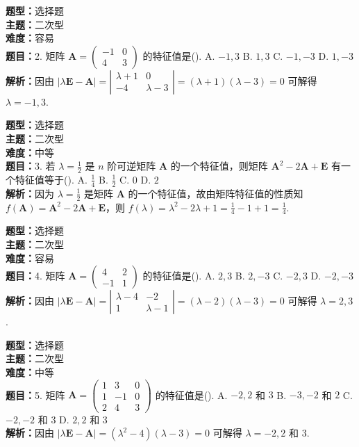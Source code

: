 \documentclass{ctexart}
\newenvironment{question}[5]{%
	\noindent\textbf{题型：}#1\\
	\textbf{主题：}#2\\
	\textbf{难度：}#3\\
	\textbf{题目：}#4\\
	\textbf{解析：}#5\\
	\vspace{1em}
}{}
\begin{document}
	
	\begin{question}
		{选择题}
		{二次型}
		{容易}
		{2. 矩阵 \(\mathbf{A}=\left(\begin{array}{cc}-1 & 0 \\ 4 & 3\end{array}\right)\) 的特征值是(\qquad). 
			A. \(-1,3\)
			B. \(1,3\)
			C. \(-1,-3\)
			D. \(1,-3\)}
		{因由 \(|\lambda \mathbf{E}-\mathbf{A}|=\left|\begin{array}{cc}\lambda+1 & 0 \\ -4 & \lambda-3\end{array}\right|=(\lambda+1)(\lambda-3)=0\) 可解得 \(\lambda=-1,3\). }
	\end{question}
	
	\begin{question}
		{选择题}
		{二次型}
		{中等}
		{3. 若 \(\lambda=\frac{1}{2}\) 是 \(n\) 阶可逆矩阵 \(\mathbf{A}\) 的一个特征值，则矩阵 \(\mathbf{A}^2-2 \mathbf{A}+\mathbf{E}\) 有一个特征值等于(\qquad). 
			A. \(\frac{1}{4}\)
			B. \(\frac{1}{2}\)
			C. \(0\)
			D. \(2\)}
		{因为 \(\lambda=\frac{1}{2}\) 是矩阵 \(\mathbf{A}\) 的一个特征值，故由矩阵特征值的性质知 \(f(\mathbf{A})=\mathbf{A}^2-2 \mathbf{A}+\mathbf{E}\)，则 \(f(\lambda)=\lambda^2-2 \lambda+1=\frac{1}{4}-1+1=\frac{1}{4}\). }
	\end{question}
	
	\begin{question}
		{选择题}
		{二次型}
		{容易}
		{4. 矩阵 \(\mathbf{A}=\left(\begin{array}{cc}4 & 2 \\ -1 & 1\end{array}\right)\) 的特征值是(\qquad). 
			A. \(2,3\)
			B. \(2,-3\)
			C. \(-2,3\)
			D. \(-2,-3\)}
		{因由 \(|\lambda \mathbf{E}-\mathbf{A}|=\left|\begin{array}{cc}\lambda-4 & -2 \\ 1 & \lambda-1\end{array}\right|=(\lambda-2)(\lambda-3)=0\) 可解得 \(\lambda=2,3\). }
	\end{question}
	
	\begin{question}
		{选择题}
		{二次型}
		{中等}
		{5. 矩阵 \(\mathbf{A}=\left(\begin{array}{ccc}1 & 3 & 0 \\ 1 & -1 & 0 \\ 2 & 4 & 3\end{array}\right)\) 的特征值是(\qquad). 
			A. \(-2,2\) 和 \(3\)
			B. \(-3,-2\) 和 \(2\)
			C. \(-2,-2\) 和 \(3\)
			D. \(2,2\) 和 \(3\)}
		{因由 \(|\lambda \mathbf{E}-\mathbf{A}|=\left(\lambda^2-4\right)(\lambda-3)=0\) 可解得 \(\lambda=-2,2\) 和 \(3\). }
	\end{question}
	
\end{document}
